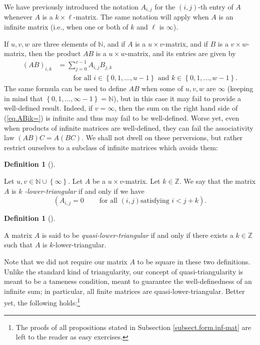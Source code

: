 \documentclass[numbers=enddot,12pt,final,onecolumn,notitlepage]{scrartcl}%
\newcounter{exer}
\theoremstyle{definition}
\newtheorem{defi}[theo]{Definition}
\newenvironment{definition}[1][]
{\begin{defi}[#1]\begin{leftbar}}
{\end{leftbar}\end{defi}}
\let\sumnonlimits\sum
\renewcommand{\sum}{\sumnonlimits\limits}
\begin{document}
We have previously introduced the notation $A_{i,j}$ for the $\left(
i,j\right)  $-th entry of $A$ whenever $A$ is a $k\times\ell$-matrix. The same
notation will apply when $A$ is an infinite matrix (i.e., when one or both of
$k$ and $\ell$ is $\infty$).

If $u,v,w$ are three elements of $\mathbb{N}$, and if $A$ is a $u\times
v$-matrix, and if $B$ is a $v\times w$-matrix, then the product $AB$ is a
$u\times w$-matrix, and its entries are given by
\begin{align}
\left(  AB\right)  _{i,k}  &  =\sum_{j=0}^{v-1}A_{i,j}B_{j,k} \label{eq.ABik=}%
\\
&  \ \ \ \ \ \ \ \ \ \ \text{for all }i\in\left\{  0,1,\ldots,u-1\right\}
\text{ and }k\in\left\{  0,1,\ldots,w-1\right\}  .\nonumber
\end{align}
The same formula can be used to define $AB$ when some of $u,v,w$ are $\infty$
(keeping in mind that $\left\{  0,1,\ldots,\infty-1\right\}  =\mathbb{N}$),
but in this case it may fail to provide a well-defined result. Indeed, if
$v=\infty$, then the sum on the right hand side of (\ref{eq.ABik=}) is
infinite and thus may fail to be well-defined. Worse yet, even when products
of infinite matrices are well-defined, they can fail the associativity law
$\left(  AB\right)  C=A\left(  BC\right)  $. We shall not dwell on these
perversions, but rather restrict ourselves to a subclass of infinite matrices
which avoids them:

\begin{definition}
Let $u,v\in\mathbb{N}\cup\left\{  \infty\right\}  $. Let $A$ be a $u\times
v$-matrix. Let $k\in\mathbb{Z}$. We say that the matrix $A$ is $k$%
\textit{-lower-triangular} if and only if we have%
\[
\left(  A_{i,j}=0\ \ \ \ \ \ \ \ \ \ \text{for all }\left(  i,j\right)  \text{
satisfying }i<j+k\right)  .
\]

\end{definition}

\begin{definition}
A matrix $A$ is said to be \textit{quasi-lower-triangular} if and only if
there exists a $k\in\mathbb{Z}$ such that $A$ is $k$-lower-triangular.
\end{definition}

Note that we did not require our matrix $A$ to be square in these two
definitions. Unlike the standard kind of triangularity, our concept of
quasi-triangularity is meant to be a tameness condition, meant to guarantee
the well-definedness of an infinite sum; in particular, all finite matrices
are quasi-lower-triangular. Better yet, the following holds:\footnote{The
proofs of all propositions stated in Subsection \ref{subsect.form.inf-mat} are
left to the reader as easy exercises.}
\end{document}
